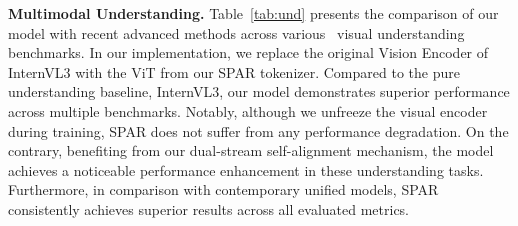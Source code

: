 \documentclass[runningheads]{llncs}
\begin{document}
\noindent\textbf{Multimodal Understanding.}
Table~\ref{tab:und} presents the comparison of our model with recent advanced methods across various~\cite{fu2023mme,liu2024mmbench,yue2024mmmu,yu2023mm,li2024seed,tong2024eyes} visual understanding benchmarks. In our implementation, we replace the original Vision Encoder of InternVL3 with the ViT from our SPAR tokenizer. Compared to the pure understanding baseline, InternVL3, our model demonstrates superior performance across multiple benchmarks. Notably, although we unfreeze the visual encoder during training, SPAR does not suffer from any performance degradation. On the contrary, benefiting from our dual-stream self-alignment mechanism, the model achieves a noticeable performance enhancement in these understanding tasks. Furthermore, in comparison with contemporary unified models, SPAR consistently achieves superior results across all evaluated metrics.
\end{document}
